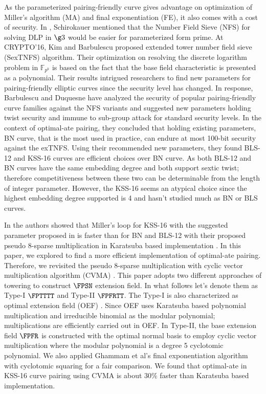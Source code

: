 As the parameterized pairing-friendly curve gives advantage on optimization of Miller's algorithm (MA) and final exponentiation (FE), it also comes with a cost of security. 
In \cite{schirokauer2010number}, Schirokauer mentioned that the Number Field Sieve (NFS) for solving DLP in $\g3$ would be easier for parameterized form prime. 
At CRYPTO'16, Kim and Barbulescu proposed extended tower number field sieve (SexTNFS) algorithm\cite{kim_ecdlp}.
Their optimization on resolving the discrete logarithm problem in $\mathbb{F}_{p^k}$ is based on the fact that the base field characteristic is presented as a polynomial.
Their results intrigued researchers to find new parameters for pairing-friendly elliptic curves since the security level has changed.
In response, Barbulescu and Duquesne have analyzed the security of popular pairing-friendly curve families against the NFS variants and suggested new parameters \cite{sylvain_new_param} holding twist security and immune to sub-group attack for standard security levels. 
In the context of optimal-ate pairing, they concluded that holding existing parameters, BN curve, that is the most used in practice, can endure at most 100-bit security against the exTNFS.  
Using their recommended new parameters, they found BLS-12 and KSS-16 curves are efficient choices over BN curve.
As both BLS-12 and BN curves have the same embedding degree and both support sextic twist; therefore competitiveness between these two can be determinable from the length of integer parameter.
However, the KSS-16 seems an atypical choice since the highest embedding degree supported is 4 and hasn't studied much as BN or BLS curves.

In \cite{self_indo17} the authors showed that Miller's loop for KSS-16 with the suggested parameter proposed in \cite{sylvain_new_param} is faster than for BN and BLS-12 with their proposed pseudo 8-sparse multiplication in Karatsuba based implementation \cite{self_indo17}.
In this paper, we explored to find a more efficient implementation of optimal-ate pairing. 
Therefore, we revisited the pseudo 8-sparse multiplication with cyclic vector multiplication algorithm (CVMA) \cite{cvma_kato}.
This paper adopts two different approaches of towering to construct $\FPSN$ extension field. 
In what follows let's denote them as Type-I $\FPTTTT$ and Type-II  $\FPFRTT$.
The Type-I is also characterized as optimal extension field (OEF) \cite{OEF}.
Since OEF uses Karatsuba based polynomial multiplication and irreducible binomial as the modular polynomial;  multiplications are efficiently carried out in OEF. 
In Type-II,  the base extension field $\FPFR$ is constructed with the optimal normal basis to employ cyclic vector multiplication where the modular polynomial is a degree 5 cyclotomic polynomial.
We also applied Ghammam et al's \cite{loubna_kss16} final exponentiation algorithm with cyclotomic squaring \cite{karabina2013squaring} for a fair comparison.
We found that optimal-ate in KSS-16 curve pairing using CVMA is about 30\% faster than Karatsuba based implementation.

